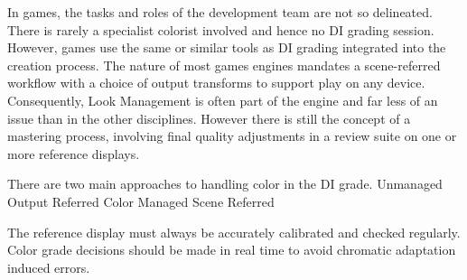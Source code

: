 In games, the tasks and roles of the development team are not so delineated. There is rarely a specialist colorist involved and hence no DI grading session. However, games use the same or similar tools as DI grading integrated into the creation process. The nature of most games engines mandates a scene-referred workflow with a choice of output transforms to support play on any device. Consequently, Look Management is often part of the engine and far less of an issue than in the other disciplines. However there is still the concept of a mastering process, involving final quality adjustments in a review suite on one or more reference displays.

There are two main approaches to handling color in the DI grade. 
Unmanaged Output Referred 
Color Managed Scene Referred

The reference display must always be accurately calibrated and checked regularly. Color grade decisions should be made in real time to avoid chromatic adaptation induced errors. 

